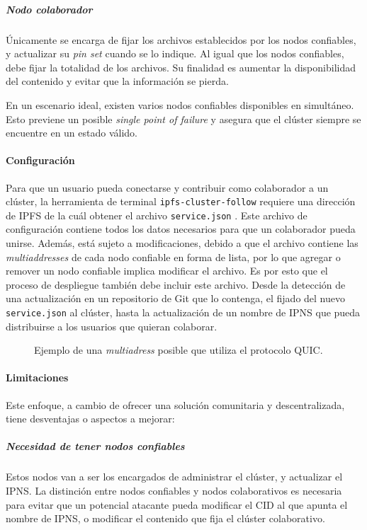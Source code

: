 \subparagraph{Nodo colaborador} Únicamente se encarga de fijar los archivos establecidos por los nodos confiables, y actualizar su \textit{pin set} cuando se lo indique. Al igual que los nodos confiables, debe fijar la totalidad de los archivos. Su finalidad es aumentar la disponibilidad del contenido y evitar que la información se pierda.

En un escenario ideal, existen varios nodos confiables disponibles en simultáneo. Esto previene un posible \textit{single point of failure} y asegura que el clúster siempre se encuentre en un estado válido.

\paragraph{Configuración} Para que un usuario pueda conectarse y contribuir como colaborador a un clúster, la herramienta de terminal \texttt{ipfs-cluster-follow} \cite{ipfs-cluster-follow} requiere una dirección de IPFS de la cuál obtener el archivo \texttt{service.json} \cite{service-json}. Este archivo de configuración contiene todos los datos necesarios para que un colaborador pueda unirse. Además, está sujeto a modificaciones, debido a que el archivo contiene las \textit{multiaddresses} \cite{multiaddr} de cada nodo confiable en forma de lista, por lo que agregar o remover un nodo confiable implica modificar el archivo. Es por esto que el proceso de despliegue también debe incluir este archivo. Desde la detección de una actualización en un repositorio de Git que lo contenga, el fijado del nuevo \texttt{service.json} al clúster, hasta la actualización de un nombre de IPNS que pueda distribuirse a los usuarios que quieran colaborar.

\begin{figure}[h]
\centering
{}
\caption{Ejemplo de una \textit{multiadress} posible que utiliza el protocolo QUIC.}
\end{figure}

\paragraph{Limitaciones}

Este enfoque, a cambio de ofrecer una solución comunitaria y descentralizada, tiene desventajas o aspectos a mejorar:

\subparagraph{Necesidad de tener nodos confiables} Estos nodos van a ser los encargados de administrar el clúster, y actualizar el IPNS. La distinción entre nodos confiables y nodos colaborativos es necesaria para evitar que un potencial atacante pueda modificar el CID al que apunta el nombre de IPNS, o modificar el contenido que fija el clúster colaborativo.
 
